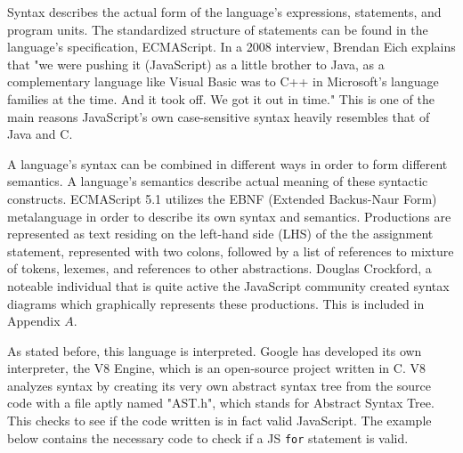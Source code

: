 \documentclass[man]{apa}
\begin{document}
Syntax describes the actual form of the language's expressions, statements, and program units. The standardized structure of statements can be found in the language's specification, ECMAScript. In a 2008 interview, Brendan Eich explains that "we were pushing it (JavaScript) as a little brother to Java, as a complementary language like Visual Basic was to C++ in Microsoft’s language families at the time. And it took off. We got it out in time." This is one of the main reasons JavaScript's own case-sensitive syntax heavily resembles that of Java and C.

A language's syntax can be combined in different ways in order to form different semantics. A language's semantics describe  actual meaning of these syntactic constructs. ECMAScript 5.1 utilizes the EBNF (Extended Backus-Naur Form) metalanguage in order to describe its own syntax and semantics. Productions are represented as text residing on the left-hand side (LHS) of the the assignment statement, represented with two colons, followed by a list of references to mixture of tokens, lexemes, and references to other abstractions. Douglas Crockford, a noteable individual that is quite active the JavaScript community created syntax diagrams which graphically represents these productions. This is included in Appendix $A$.

As stated before, this language is interpreted. Google has developed its own interpreter, the V8 Engine, which is an open-source project written in C. V8 analyzes syntax by creating its very own abstract syntax tree from the source code with a file aptly named "AST.h", which stands for Abstract Syntax Tree. This checks to see if the code written is in fact valid JavaScript. The example below contains the necessary code to check if a JS \texttt{for} statement is valid.



\end{document}
